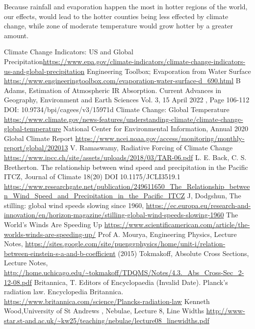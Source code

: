 \documentclass{book}
\begin{document}
   Because rainfall and evaporation happen the most in hotter regions of the world, our effects, would lead to the hotter counties being less effected by climate change, while zone of moderate temperature would grow hotter by a greater amount.
           		
	\begin{thebibliography}{99}
		 Climate Change Indicators: US and Global Precipitation\url{https://www.epa.gov/climate-indicators/climate-change-indicators-us-and-global-precipitation}
	     Engineering Toolbox; Evaporation from Water Surface \url{https://www.engineeringtoolbox.com/evaporation-water-surface-d_690.html}
	     B Adams, Estimation of Atmospheric IR Absorption. Current Advances in Geography, Environment and Earth Sciences Vol. 3, 15 April 2022 , Page 106-112  DOI: 10.9734/bpi/cagees/v3/15971d
	     Climate Change: Global Temperature \url{https://www.climate.gov/news-features/understanding-climate/climate-change-global-temperature}
	     National Center for Environmental Information,  Annual 2020 Global Climate Report \url{https://www.ncei.noaa.gov/access/monitoring/monthly-report/global/202013}
	     V. Ramaswamy, Radiative Forcing of Climate Change \url{https://www.ipcc.ch/site/assets/uploads/2018/03/TAR-06.pdf}
	     L. E. Back, C. S. Bretherton. The relationship between wind speed and precipitation in the Pacific ITCZ, Journal of Climate 18(20) DOI 10.1175/JCLI3519.1 \url{https://www.researchgate.net/publication/249611650_The_Relationship_between_Wind_Speed_and_Precipitation_in_the_Pacific_ITCZ}
	     J, Dodgshun, The stilling: global wind speeds slowing since 1960, \url{https://ec.europa.eu/research-and-innovation/en/horizon-magazine/stilling-global-wind-speeds-slowing-1960}
	     The World’s Winds Are Speeding Up \url{https://www.scientificamerican.com/article/the-worlds-winds-are-speeding-up/}
		 Prof A. Mourya, Engineering Physics, Lecture Notes, \url{https://sites.google.com/site/puenggphysics/home/unit-i/relation-between-einstein-s-a-and-b-coefficient} (2015)
		 Tokmakoff, Absolute Cross Sections, Lecture Notes, \url{http://home.uchicago.edu/~tokmakoff/TDQMS/Notes/4.3._Abs_Cross-Sec_2-12-08.pdf}
		 Britannica, T. Editors of Encyclopaedia (Invalid Date). Planck's radiation law. Encyclopedia Britannica. \url{https://www.britannica.com/science/Plancks-radiation-law}
		 Kenneth Wood,University of St Andrews , Nebulae, Lecture 8, Line Widths \url{http://www-star.st-and.ac.uk/~kw25/teaching/nebulae/lecture08_linewidths.pdf}

\end{thebibliography}
\end{document}
